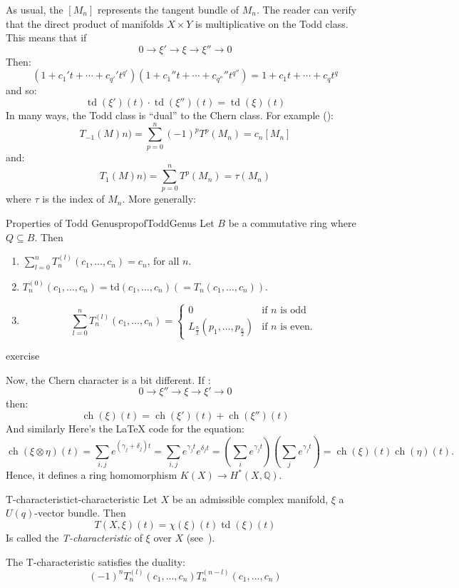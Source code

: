 \documentclass{book}
\newcommand{\Q}{{\mathbb{Q}}}
\newcommand{\ch}{{\operatorname{ch}}}
\newcommand{\td}{{\operatorname{td}}}
\newcommand{\sse}{\subseteq}
\begin{document}
As usual, the $[M_n]$ represents the tangent bundle of $M_n$. The reader can verify that the direct product of
manifolds $X\times Y$ is multiplicative on the Todd class. This means that if
\[
  0 \to \xi' \to \xi \to \xi'' \to 0
\]
Then:
\[
  (1 + c_1't + \cdots + c_{q'}'t^{q'})(1 + c_1''t + \cdots + c_{q''}''t^{q''}) =  1 + c_1t + \cdots + c_{q}t^{q}
\]
and so:
\[
  \td(\xi')(t)\cdot \td(\xi'')(t)  =\td(\xi)(t)
\]
In many ways, the Todd class is ``dual'' to the
Chern class. For example (\cite[p.93]{hirzebruchTopologicalMethodsAlgebraic1995}):
\[
  T_{-1}(M)n) = \sum_{p=0}^n (-1)^p T^p(M_n) = c_n[M_n]
\]
and:
\[
  T_{1}(M)n) = \sum_{p=0}^n  T^p(M_n) = \tau(M_n)
\]
where $\tau$ is the index of $M_n$. More generally:


\begin{prop}{Properties of Todd Genus}{propofToddGenus}
  Let $B$ be a commutative ring where $Q \sse B$. Then
  \begin{enumerate}
  \item $\sum_{l=0}^n T_n^{(l)}(c_1,\ldots,c_n) = c_n$, for all $n$.

  \item $T_n^{(0)}(c_1,\ldots,c_n) = \text{td}(c_1,\ldots,c_n) (= T_n(c_1,\ldots,c_n))$.

  \item
  \[
      \sum_{l=0}^n T_n^{(l)}(c_1,\ldots,c_n) = \begin{cases}
          0 & \text{if }n\text{ is odd} \\
          L_{\frac{n}{2}}(p_1,\ldots,p_{\frac{n}{2}}) & \text{if }n\text{ is even.}
      \end{cases}
  \]
  \end{enumerate}


\end{prop}

\begin{Proof}
  exercise
\end{Proof}

Now, the Chern character is a bit different. If :
\[
  0 \to \xi'' \to \xi \to \xi' \to 0
\]
then:
\[
  \ch(\xi)(t) = \ch(\xi')(t) + \ch(\xi'')(t)
\]
And similarly
Here's the LaTeX code for the equation:
\[
    \operatorname{ch}(\xi \otimes \eta)(t) = \sum_{i,j} e^{(\gamma_j+\delta_j)t} = \sum_{i,j} e^{\gamma_j t}e^{\delta_j t} = \left(\sum_i e^{\gamma_j t}\right)\left(\sum_j e^{\gamma_j t}\right) = \operatorname{ch}(\xi)(t)\operatorname{ch}(\eta)(t).
\]
Hence, it defines a ring homomorphism $K(X) \to H^*(X, \Q)$.

\begin{defn}{T-characteristic}{t-characteristic}
  Let $X$ be an admissible complex manifold, $\xi$ a $U(q)$-vector bundle. Then
  \[
    T(X, \xi)(t) = \chi(\xi)(t)\td(\xi)(t)
  \]
  Is called the \emph{T-characteristic} of $\xi$ over $X$
  (see~\cite[p.226]{gallierComplexAlgebraicGeometry2011}).
\end{defn}
The T-characteristic satisfies the duality:
\[
  (-1)^n T_n^{(l)}(c_1, ..., c_n) T_n^{(n-l)}(c_1, ..., c_n)
\]
\end{document}
